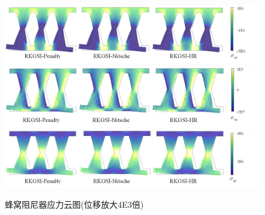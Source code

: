 \begin{figure}[H]
    \centering
        \includegraphics[scale=0.55]{figure/DAMPER/Honeycomb/M11.png}
        \includegraphics[scale=0.55]{figure/DAMPER/Honeycomb/M12.png}
        \includegraphics[scale=0.55]{figure/DAMPER/Honeycomb/M22.png}
    \caption{蜂窝阻尼器应力云图(位移放大4E3倍)}\label{HoneycombM}
\end{figure}
\newpage
